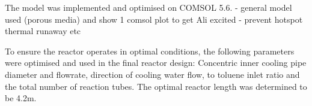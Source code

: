 The model was implemented and optimised on COMSOL 5.6. 
- general model used (porous media) and show 1 comsol plot to get Ali excited
- prevent hotspot thermal runaway etc

To ensure the reactor operates in optimal conditions, the following parameters were optimised and used in the final reactor design: Concentric inner cooling pipe diameter and flowrate, direction of cooling water flow,  to toluene inlet ratio and the total number of reaction tubes. %
The optimal reactor length was determined to be 4.2m. 


